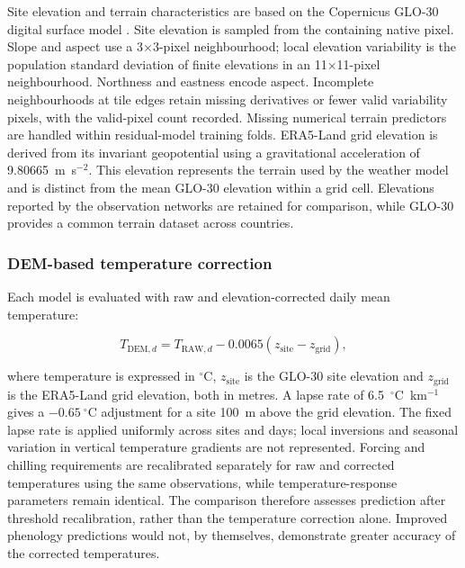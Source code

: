 \documentclass[a4paper,12pt]{article}
\let\OriginalSubsubsection\subsubsection
\renewcommand{\subsubsection}{\FloatBarrier\OriginalSubsubsection}
\begin{document}
Site elevation and terrain characteristics are based on the Copernicus GLO-30 digital surface model \citep{esaAirbusCopernicusDEM2022}. Site elevation is sampled from the containing native pixel. Slope and aspect use a 3$\times$3-pixel neighbourhood; local elevation variability is the population standard deviation of finite elevations in an 11$\times$11-pixel neighbourhood. Northness and eastness encode aspect. Incomplete neighbourhoods at tile edges retain missing derivatives or fewer valid variability pixels, with the valid-pixel count recorded. Missing numerical terrain predictors are handled within residual-model training folds. ERA5-Land grid elevation is derived from its invariant geopotential using a gravitational acceleration of 9.80665~m~s$^{-2}$. This elevation represents the terrain used by the weather model and is distinct from the mean GLO-30 elevation within a grid cell. Elevations reported by the observation networks are retained for comparison, while GLO-30 provides a common terrain dataset across countries.

\subsubsection{DEM-based temperature correction}

Each model is evaluated with raw and elevation-corrected daily mean temperature:

\begin{equation}
T_{\mathrm{DEM},d}=T_{\mathrm{RAW},d}-0.0065\left(z_{\mathrm{site}}-z_{\mathrm{grid}}\right),
\label{eq:temperature_adjustment}
\end{equation}

where temperature is expressed in $^{\circ}$C, $z_{\mathrm{site}}$ is the GLO-30 site elevation and $z_{\mathrm{grid}}$ is the ERA5-Land grid elevation, both in metres. A lapse rate of 6.5~$^{\circ}$C~km$^{-1}$ gives a $-0.65~^{\circ}$C adjustment for a site 100~m above the grid elevation. The fixed lapse rate is applied uniformly across sites and days; local inversions and seasonal variation in vertical temperature gradients are not represented. Forcing and chilling requirements are recalibrated separately for raw and corrected temperatures using the same observations, while temperature-response parameters remain identical. The comparison therefore assesses prediction after threshold recalibration, rather than the temperature correction alone. Improved phenology predictions would not, by themselves, demonstrate greater accuracy of the corrected temperatures.
\end{document}
